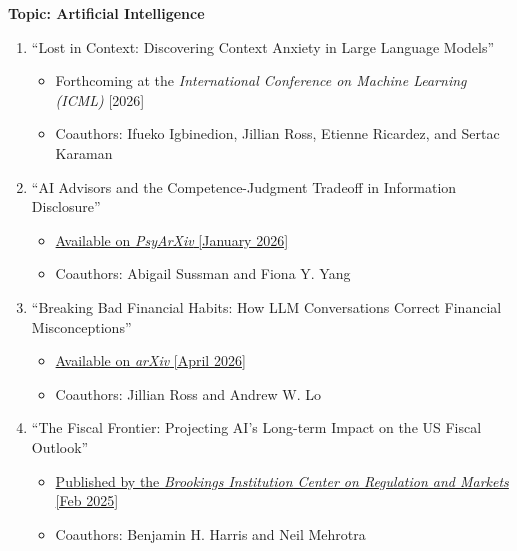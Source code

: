 \documentclass[11pt]{article}
\begin{document}
{\bf Topic: Artificial Intelligence} \\
\vspace*{-.2in}
\begin{enumerate}

\item ``Lost in Context: Discovering Context Anxiety in Large Language Models''
\begin{itemize}
\vspace*{-.07in}
	\item Forthcoming at the {\it International Conference on Machine Learning (ICML)} [2026]
\vspace*{-.07in}
	\item Coauthors: Ifueko Igbinedion, Jillian Ross, Etienne Ricardez, and Sertac Karaman
\end{itemize}
\vskip 0.24cm

\item ``AI Advisors and the Competence-Judgment Tradeoff in Information Disclosure''
\begin{itemize}
\vspace*{-.07in}
	\item \href{https://osf.io/preprints/psyarxiv/sejdg_v1}{Available on {\it PsyArXiv} [January 2026]}
\vspace*{-.07in}
	\item Coauthors: Abigail Sussman and Fiona Y. Yang
\end{itemize}
\vskip 0.24cm

\item ``Breaking Bad Financial Habits: How LLM Conversations Correct Financial Misconceptions''
\begin{itemize}
\vspace*{-.07in}
	\item \href{https://arxiv.org/abs/2604.27022}{Available on {\it arXiv} [April 2026]}
\vspace*{-.07in}
	\item Coauthors: Jillian Ross and Andrew W. Lo
\end{itemize}
\vskip 0.24cm

\item ``The Fiscal Frontier: Projecting AI's Long-term Impact on the US Fiscal Outlook''
\begin{itemize}
\vspace*{-.07in}
	\item \href{https://www.brookings.edu/articles/the-fiscal-frontier-projecting-ais-long-term-impact-on-the-us-fiscal-outlook/}{Published by the {\it Brookings Institution Center on Regulation and Markets} [Feb 2025]}
\vspace*{-.07in}
	\item Coauthors: Benjamin H. Harris and Neil Mehrotra
\end{itemize}
\vskip 0.24cm


\end{enumerate}
\end{document}
